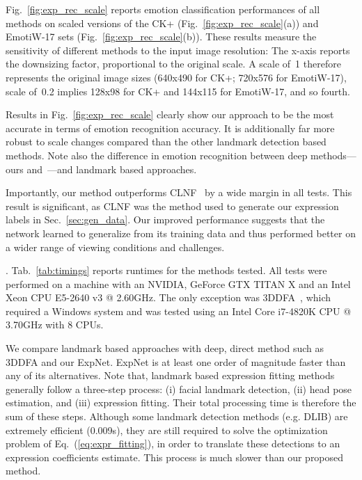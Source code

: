 \documentclass[a4paper, 10pt, conference]{ieeeconf}
\newcommand{\minisection}[1]{\vspace{2mm}\noindent{\bf #1}.}
\begin{document}
Fig.~\ref{fig:exp_rec_scale} reports emotion classification performances of all methods on scaled versions of the CK+ (Fig.~\ref{fig:exp_rec_scale}(a)) and EmotiW-17 sets (Fig.~\ref{fig:exp_rec_scale}(b)). These results measure the sensitivity of different methods to the input image resolution: The x-axis reports the downsizing factor, proportional to the original scale. A scale of~1 therefore represents the original image sizes (640x490 for CK+; 720x576 for EmotiW-17), scale of~0.2 implies 128x98 for CK+ and 144x115 for EmotiW-17, and so fourth. 

Results in Fig.~\ref{fig:exp_rec_scale} clearly show our approach to be the most accurate in terms of emotion recognition accuracy. It is additionally far more robust to scale changes compared than the other landmark detection based methods. Note also the  difference in emotion recognition between deep methods---ours and~\cite{zhu2015}---and landmark based approaches.

Importantly, our method outperforms CLNF~\cite{baltrusaitis2013constrained} by a wide margin in all tests. This result is significant, as CLNF was the method used to generate our expression labels in Sec.~\ref{sec:gen_data}. Our improved performance suggests that the network learned to generalize from its training data and thus performed better on a wider range of viewing conditions and challenges.



\minisection{Runtime} Tab.~\ref{tab:timings} reports runtimes for the methods tested. All tests were performed on a machine with an NVIDIA, GeForce GTX TITAN X and an Intel Xeon CPU E5-2640 v3 @ 2.60GHz. The only exception was 3DDFA~\cite{zhu2015}, which required a Windows system and was tested using an Intel Core i7-4820K CPU @ 3.70GHz with 8 CPUs.


We compare landmark based approaches with deep, direct method such as 3DDFA and our ExpNet. ExpNet is at least one order of magnitude faster than any of its alternatives. Note that, landmark based expression fitting methods generally follow a three-step process: (i) facial landmark detection, (ii) head pose estimation, and (iii) expression fitting. Their total processing time is therefore the sum of these steps. Although some landmark detection methods (e.g. DLIB) are extremely efficient (0.009s), they are still required to solve the optimization problem of Eq.~(\ref{eq:expr_fitting}), in order to translate these detections to an expression coefficients estimate. This process is much slower than our proposed method.
\end{document}
